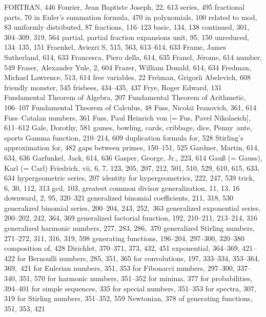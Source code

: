 FORTRAN, 446
Fourier, Jean Baptiste Joseph, 22, 613
\sub series, 495
fractional parts, 70
\sub in Euler's summation formula, 470
\sub in polynomials, 100
\sub related to mod, 83
\sub uniformly distributed, 87
fractions, 116--123
\sub basic, 134, 138
\sub continued, 301, 304--309, 319, 564
\sub partial, \see partial fraction expansions
\sub unit, 95, 150
\sub unreduced, 134--135, 151
Fraenkel, Aviezri S, 515, 563, 613--614, 633
Frame, James Sutherland, 614, 633
Francesca, Piero della, 614, 635
Franel, J\'erome, 614
\sub number, 549
Fraser, Alexander Yule, 2, 604
Frazer, William Donald, 614, 634
Fredman, Michael Lawrence, 513, 614
free variables, 22
Fre{\u\i}man, Grigori{\u\i} Abelevich, 608
friendly monster, 545
frisbees, 434--435, 437
Frye, Roger Edward, 131
Fundamental Theorem of Algebra, 207
Fundamental Theorem of Arithmetic, 106--107
Fundamental Theorem of Calculus, 48
Fuss, Nicola{\u\i} Ivanovich, 361, 614
\sub Fuss--Catalan numbers, 361
Fuss, Paul Heinrich von [= Fus, Pavel Nikolaeich], 611--612
\medskip
Gale, Dorothy, 581
games, \see bowling, cards, cribbage, dice, Penny~ante, sports
Gamma function, 210--214, 609
\sub duplication formula for, 528
\sub Stirling's approximation for, 482
gaps between primes, 150--151, 525
Gardner, Martin, 614, 634, 636
Garfunkel, Jack, 614, 636
Gasper, George, Jr., 223, 614
Gau{\ss} (= Gauss), Karl (= Carl) Friedrich, vii, 6, 7, 123, 205, 207, 212, %
 501, 510, 529, 610, 615, 633, 634
\sub hypergeometric series, 207
\sub identity for hypergeometrics, 222, 247, 539
\sub trick, 6, 30, 112, 313
gcd, 103, \see greatest common divisor
generalization, 11, 13, 16
\sub downward, 2, 95, 320--321
generalized binomial coefficients, 211, 318, 530
generalized binomial series, 200--204, 243, 252,~363
generalized exponential series, 200--202, 242, 364, 369
generalized factorial function, 192, 210--211, 213--214, 316
generalized harmonic numbers, 277, 283, 286,~370\kern-3pt
generalized Stirling numbers, 271--272, 311, 316, 319, 598
generating functions, 196--204, 297--300, 320--380
\sub composition of, 428
\sub Dirichlet, 370--371, 373, 432, 451
\sub exponential, 364--369, 421--422
\sub for Bernoulli numbers, 285, 351, 365
\sub for convolutions, 197, 333--334, 353--364, 369,~421
\sub for Eulerian numbers, 351, 353
\sub for Fibonacci numbers, 297--300, 337--340, 351, 570
\sub for harmonic numbers, 351--352
\sub for minima, 377
\sub for probabilities, 394--401
\sub for simple sequences, 335
\sub for special numbers, 351--353
\sub for spectra, 307, 319
\sub for Stirling numbers, 351--352, 559
\sub Newtonian, 378
\sub of generating functions, 351, 353, 421
